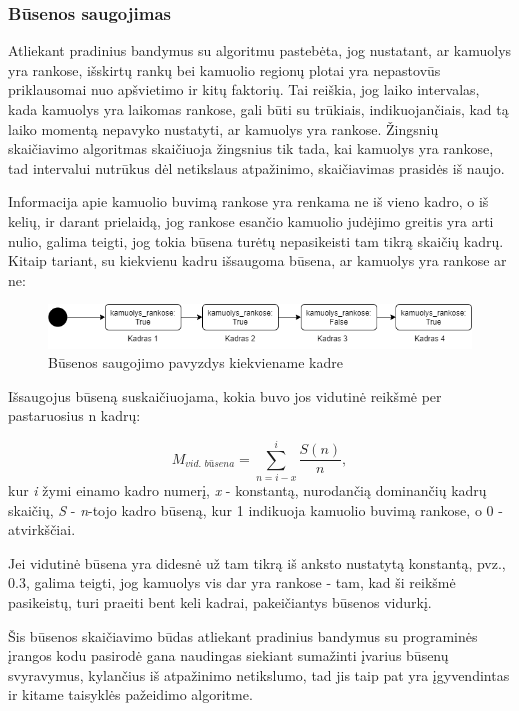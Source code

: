 \documentclass{VUMIFPSbakalaurinis}
\begin{document}
\subsubsection{Būsenos saugojimas}
Atliekant pradinius bandymus su algoritmu pastebėta, jog nustatant, ar kamuolys yra rankose, išskirtų rankų bei kamuolio regionų plotai yra nepastovūs priklausomai nuo apšvietimo ir kitų faktorių. Tai reiškia, jog laiko intervalas, kada kamuolys yra laikomas rankose, gali būti su trūkiais, indikuojančiais, kad tą laiko momentą nepavyko nustatyti, ar kamuolys yra rankose. Žingsnių skaičiavimo algoritmas skaičiuoja žingsnius tik tada, kai kamuolys yra rankose, tad intervalui nutrūkus dėl netikslaus atpažinimo, skaičiavimas prasidės iš naujo. 

Informacija apie kamuolio buvimą rankose yra renkama ne iš vieno kadro, o iš kelių, ir darant prielaidą, jog rankose esančio kamuolio judėjimo greitis yra arti nulio, galima teigti, jog tokia būsena turėtų nepasikeisti tam tikrą skaičių kadrų. Kitaip tariant, su kiekvienu kadru išsaugoma būsena, ar kamuolys yra rankose ar ne:

\begin{figure}[H]
	\centering
	\includegraphics[scale=0.6]{img/state}
	\caption{Būsenos saugojimo pavyzdys kiekviename kadre}
	\label{img:state}
\end{figure}

Išsaugojus būseną suskaičiuojama, kokia buvo jos vidutinė reikšmė per pastaruosius n kadrų: 

\begin{equation}\label{eq:avg_state}
	M_{\textit{vid. būsena}} = \sum_{n=i-x}^{i} \frac{S(n)}{n},
\end{equation}
kur \textit{i} žymi einamo kadro numerį, \textit{x} - konstantą, nurodančią dominančių kadrų skaičių, \textit{S} - \textit{n}-tojo kadro būseną, kur 1 indikuoja kamuolio buvimą rankose, o 0 - atvirkščiai.

Jei vidutinė būsena yra didesnė už tam tikrą iš anksto nustatytą konstantą, pvz., 0.3, galima teigti, jog kamuolys vis dar yra rankose - tam, kad ši reikšmė pasikeistų, turi praeiti bent keli kadrai, pakeičiantys būsenos vidurkį. 

Šis būsenos skaičiavimo būdas atliekant pradinius bandymus su programinės įrangos kodu pasirodė gana naudingas siekiant sumažinti įvarius būsenų svyravymus, kylančius iš atpažinimo netikslumo, tad jis taip pat yra įgyvendintas ir kitame taisyklės pažeidimo algoritme. 
\end{document}
